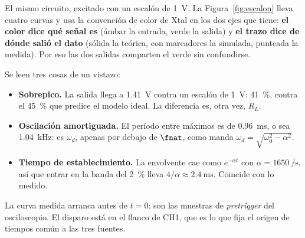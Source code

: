 El mismo circuito, excitado con un escalón de \SI{1}{\volt}. La
Figura~\ref{fig:escalon} lleva cuatro curvas y usa la convención de color de
Xtal en los dos ejes que tiene: \textbf{el color dice qué señal es} (ámbar la
entrada, verde la salida) y \textbf{el trazo dice de dónde salió el dato}
(sólida la teórica, con marcadores la simulada, punteada la medida). Por eso las
dos salidas comparten el verde sin confundirse.

Se leen tres cosas de un vistazo:

\begin{itemize}[itemsep=2pt, topsep=4pt]
  \item \textbf{Sobrepico.} La salida llega a \SI{1.41}{\volt} contra un escalón
        de \SI{1}{\volt}: \SI{41}{\percent}, contra el \SI{45}{\percent} que
        predice el modelo ideal. La diferencia es, otra vez, $R_L$.
  \item \textbf{Oscilación amortiguada.} El período entre máximos es de
        \SI{0.96}{\milli\second}, o sea \SI{1.04}{\kilo\hertz}: es $\omega_d$,
        apenas por debajo de $\fnat$, como manda
        $\omega_d = \sqrt{\omega_0^2 - \alpha^2}$.
  \item \textbf{Tiempo de establecimiento.} La envolvente cae como
        $e^{-\alpha t}$ con $\alpha = \SI{1650}{\per\second}$, así que entrar en
        la banda del \SI{2}{\percent} lleva $4/\alpha \approx
        \SI{2.4}{\milli\second}$. Coincide con lo medido.
  \end{itemize}

\noindent
La curva medida arranca antes de $t = 0$: son las muestras de \emph{pretrigger}
del osciloscopio. El disparo está en el flanco de CH1, que es lo que fija el
origen de tiempos común a las tres fuentes.
